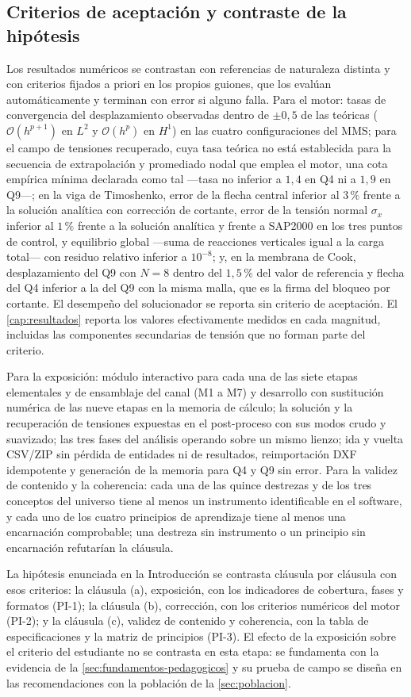 \subsection{Criterios de aceptación y contraste de la hipótesis}
\label{sec:validacion-resultados}

Los resultados numéricos se contrastan con referencias de naturaleza distinta y con criterios fijados a priori en los propios guiones, que los evalúan automáticamente y terminan con error si alguno falla. Para el motor: tasas de convergencia del desplazamiento observadas dentro de $\pm0{,}5$ de las teóricas ($\mathcal{O}(h^{p+1})$ en $L^2$ y $\mathcal{O}(h^{p})$ en $H^1$) en las cuatro configuraciones del MMS; para el campo de tensiones recuperado, cuya tasa teórica no está establecida para la secuencia de extrapolación y promediado nodal que emplea el motor, una cota empírica mínima declarada como tal —tasa no inferior a $1{,}4$ en Q4 ni a $1{,}9$ en Q9—; en la viga de Timoshenko, error de la flecha central inferior al $3\,\%$ frente a la solución analítica con corrección de cortante, error de la tensión normal $\sigma_x$ inferior al $1\,\%$ frente a la solución analítica y frente a SAP2000 en los tres puntos de control, y equilibrio global —suma de reacciones verticales igual a la carga total— con residuo relativo inferior a $10^{-8}$; y, en la membrana de Cook, desplazamiento del Q9 con $N=8$ dentro del $1{,}5\,\%$ del valor de referencia y flecha del Q4 inferior a la del Q9 con la misma malla, que es la firma del bloqueo por cortante. El desempeño del solucionador se reporta sin criterio de aceptación. El \autoref{cap:resultados} reporta los valores efectivamente medidos en cada magnitud, incluidas las componentes secundarias de tensión que no forman parte del criterio.

Para la exposición: módulo interactivo para cada una de las siete etapas elementales y de ensamblaje del canal (M1 a M7) y desarrollo con sustitución numérica de las nueve etapas en la memoria de cálculo; la solución y la recuperación de tensiones expuestas en el post-proceso con sus modos crudo y suavizado; las tres fases del análisis operando sobre un mismo lienzo; ida y vuelta CSV/ZIP sin pérdida de entidades ni de resultados, reimportación DXF idempotente y generación de la memoria para Q4 y Q9 sin error. Para la validez de contenido y la coherencia: cada una de las quince destrezas y de los tres conceptos del universo tiene al menos un instrumento identificable en el software, y cada uno de los cuatro principios de aprendizaje tiene al menos una encarnación comprobable; una destreza sin instrumento o un principio sin encarnación refutarían la cláusula.

La hipótesis enunciada en la Introducción se contrasta cláusula por cláusula con esos criterios: la cláusula (a), exposición, con los indicadores de cobertura, fases y formatos (PI-1); la cláusula (b), corrección, con los criterios numéricos del motor (PI-2); y la cláusula (c), validez de contenido y coherencia, con la tabla de especificaciones y la matriz de principios (PI-3). El efecto de la exposición sobre el criterio del estudiante no se contrasta en esta etapa: se fundamenta con la evidencia de la \autoref{sec:fundamentos-pedagogicos} y su prueba de campo se diseña en las recomendaciones con la población de la \autoref{sec:poblacion}.

